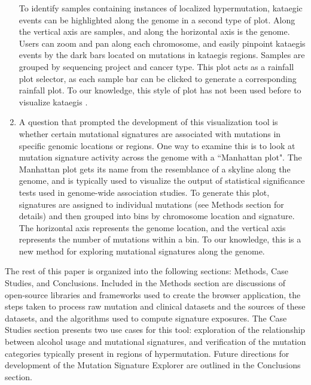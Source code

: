 \documentclass[12pt, letterpaper]{article}
\begin{document}
\begin{enumerate}
To identify samples containing instances of localized hypermutation, kataegic events can be highlighted along the genome in a second type of plot.
Along the vertical axis are samples, and along the horizontal axis is the genome.
Users can zoom and pan along each chromosome, and easily pinpoint kataegis events by the dark bars located on mutations in kataegis regions.
Samples are grouped by sequencing project and cancer type.
This plot acts as a rainfall plot selector, as each sample bar can be clicked to generate a corresponding rainfall plot.
To our knowledge, this style of plot has not been used before to visualize kataegis .
    
\item A question that prompted the development of this visualization tool is whether certain mutational signatures are associated with mutations in specific genomic locations or regions.
One way to examine this is to look at mutation signature activity across the genome with a ``Manhattan plot".
The Manhattan plot gets its name from the resemblance of a skyline along the genome, and is typically used to visualize the output of statistical significance tests used in genome-wide association studies\cite{gibson2010hints}.
To generate this plot, signatures are assigned to individual mutations (see Methods section for details) and then grouped into bins by chromosome location and signature.
The horizontal axis represents the genome location, and the vertical axis represents the number of mutations within a bin.
To our knowledge, this is a new method for exploring mutational signatures along the genome.

\end{enumerate}

The rest of this paper is organized into the following sections: Methods, Case Studies, and Conclusions. Included in the Methods section are discussions of open-source libraries and frameworks used to create the browser application, the steps taken to process raw mutation and clinical datasets and the sources of these datasets, and the algorithms used to compute signature exposures. The Case Studies section presents two use cases for this tool: exploration of the relationship between alcohol usage and mutational signatures, and verification of the mutation categories typically present in regions of hypermutation. Future directions for development of the Mutation Signature Explorer are outlined in the Conclusions section.
\end{document}
